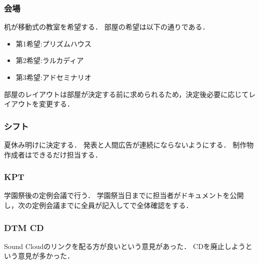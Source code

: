 \subsubsection{会場}
机が移動式の教室を希望する．
部屋の希望は以下の通りである．
\begin{itemize}
    \item 第1希望:プリズムハウス
    \item 第2希望:ラルカディア
    \item 第3希望:アドセミナリオ  
\end{itemize}
部屋のレイアウトは部屋が決定する前に求められるため，決定後必要に応じてレイアウトを変更する．
    
\subsubsection{シフト}
夏休み明けに決定する．
発表と人間広告が連続にならないようにする．
制作物作成者はできるだけ担当する．

\subsubsection{KPT}
学園祭後の定例会議で行う．
学園祭当日までに担当者がドキュメントを公開し，次の定例会議までに全員が記入してで全体確認をする．

\subsubsection{DTM CD}
Sound Cloudのリンクを配る方が良いという意見があった．
CDを廃止しようという意見が多かった．

